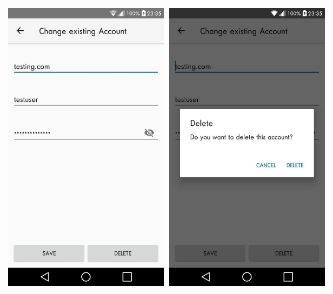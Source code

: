 \documentclass{beamer}
\begin{document}
\begin{frame}{}
\vfill
\centering
\includegraphics[width=0.31\textwidth]{images/ChangeAccountActivity.jpg}
\hspace{1cm}
\includegraphics[width=0.31\textwidth]{images/DeleteAccount.jpg}
\vfill
\end{frame}
\end{document}
